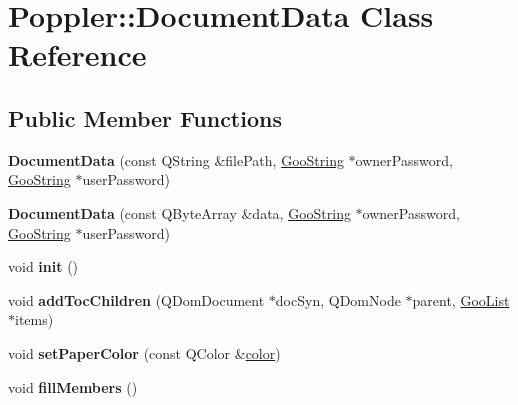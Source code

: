 \hypertarget{class_poppler_1_1_document_data}{}\section{Poppler\+:\+:Document\+Data Class Reference}
\label{class_poppler_1_1_document_data}
\subsection*{Public Member Functions}
\begin{DoxyCompactItemize}
\item 
\mbox{\label{class_poppler_1_1_document_data_a9d498cb55d7f0108b92afaa27b68f3a5}} 
{\bfseries Document\+Data} (const Q\+String \&file\+Path, \hyperlink{class_goo_string}{Goo\+String} $\ast$owner\+Password, \hyperlink{class_goo_string}{Goo\+String} $\ast$user\+Password)
\item 
\mbox{\label{class_poppler_1_1_document_data_ab01b72c60a4984dc97859a3326f08853}} 
{\bfseries Document\+Data} (const Q\+Byte\+Array \&data, \hyperlink{class_goo_string}{Goo\+String} $\ast$owner\+Password, \hyperlink{class_goo_string}{Goo\+String} $\ast$user\+Password)
\item 
\mbox{\label{class_poppler_1_1_document_data_af89ae17bb0d6c6c8fda3a1572f4f2d64}} 
void {\bfseries init} ()
\item 
\mbox{\label{class_poppler_1_1_document_data_a08f471579dfc698ea351d7dc26713ade}} 
void {\bfseries add\+Toc\+Children} (Q\+Dom\+Document $\ast$doc\+Syn, Q\+Dom\+Node $\ast$parent, \hyperlink{class_goo_list}{Goo\+List} $\ast$items)
\item 
\mbox{\label{class_poppler_1_1_document_data_a885688adf18fd3c26efca339c8422e18}} 
void {\bfseries set\+Paper\+Color} (const Q\+Color \&\hyperlink{structcolor}{color})
\item 
\mbox{\label{class_poppler_1_1_document_data_ad6b369b00e469f13ad6e5d3f491435f9}} 
void {\bfseries fill\+Members} ()
\end{DoxyCompactItemize}
